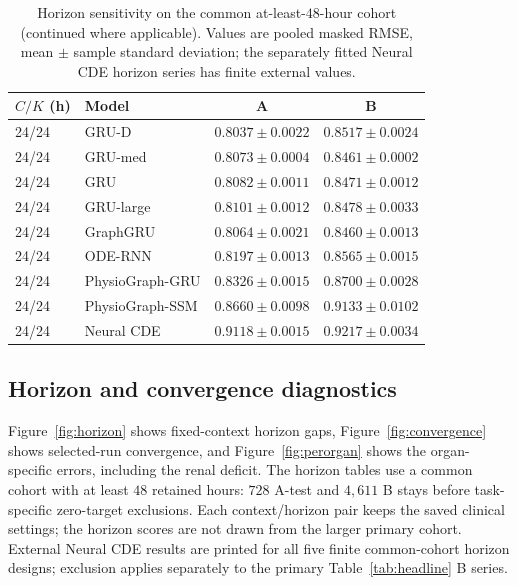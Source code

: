 \clearpage
\begin{table}[tbp]
\centering
\caption{Horizon sensitivity on the common at-least-$48$-hour cohort (continued where applicable). Values are pooled masked RMSE, mean $\pm$ sample standard deviation; the separately fitted Neural CDE horizon series has finite external values.}\label{tab:horizon36}
\small\setlength{\tabcolsep}{4pt}
\begin{tabular}{llcc}
\toprule
$C/K$ (h) 
& Model 
& A 
& B 
\\
\midrule
24/24 
& GRU-D 
& $0.8037\pm0.0022$ 
& $0.8517\pm0.0024$ 
\\
24/24 
& GRU-med 
& $0.8073\pm0.0004$ 
& $0.8461\pm0.0002$ 
\\
24/24 
& GRU 
& $0.8082\pm0.0011$ 
& $0.8471\pm0.0012$ 
\\
24/24 
& GRU-large 
& $0.8101\pm0.0012$ 
& $0.8478\pm0.0033$ 
\\
24/24 
& GraphGRU 
& $0.8064\pm0.0021$ 
& $0.8460\pm0.0013$ 
\\
24/24 
& ODE-RNN 
& $0.8197\pm0.0013$ 
& $0.8565\pm0.0015$ 
\\
24/24 
& PhysioGraph-GRU 
& $0.8326\pm0.0015$ 
& $0.8700\pm0.0028$ 
\\
24/24 
& PhysioGraph-SSM 
& $0.8660\pm0.0098$ 
& $0.9133\pm0.0102$ 
\\
24/24 
& Neural CDE 
& $0.9118\pm0.0015$ 
& $0.9217\pm0.0034$ 
\\
\bottomrule
\end{tabular}
\end{table}

\clearpage
\clearpage
\subsection{Horizon and convergence diagnostics}
Figure~\ref{fig:horizon} shows fixed-context horizon gaps, Figure~\ref{fig:convergence} shows selected-run convergence, and Figure~\ref{fig:perorgan} shows the organ-specific errors, including the renal deficit.
The horizon tables use a common cohort with at least $48$ retained hours: $728$ A-test and $4{,}611$ B stays before task-specific zero-target exclusions. Each context/horizon pair keeps the saved clinical settings; the horizon scores are not drawn from the larger primary cohort. External Neural CDE results are printed for all five finite common-cohort horizon designs; exclusion applies separately to the primary Table~\ref{tab:headline} B series.


